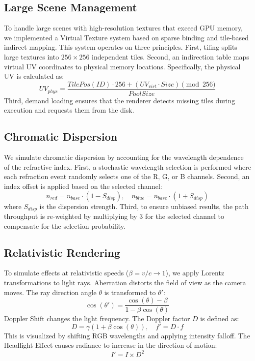 \documentclass[sigconf]{acmart}
\begin{document}
\subsection{Large Scene Management}
To handle large scenes with high-resolution textures that exceed GPU memory, we implemented a Virtual Texture system based on sparse binding and tile-based indirect mapping.
This system operates on three principles. First, tiling splits large textures into $256 \times 256$ independent tiles. Second, an indirection table maps virtual UV coordinates to physical memory locations. Specifically, the physical UV is calculated as:
\begin{equation}
UV_{phys} = \frac{TilePos(ID) \cdot 256 + (UV_{virt} \cdot Size) \pmod{256}}{PoolSize}
\end{equation}
Third, demand loading ensures that the renderer detects missing tiles during execution and requests them from the disk.

\subsection{Chromatic Dispersion}
We simulate chromatic dispersion by accounting for the wavelength dependence of the refractive index.
First, a stochastic wavelength selection is performed where each refraction event randomly selects one of the R, G, or B channels.
Second, an index offset is applied based on the selected channel:
\begin{equation}
n_{red} = n_{base} \cdot (1 - S_{disp}), \quad n_{blue} = n_{base} \cdot (1 + S_{disp})
\end{equation}
where $S_{disp}$ is the dispersion strength.
Third, to ensure unbiased results, the path throughput is re-weighted by multiplying by 3 for the selected channel to compensate for the selection probability.

\subsection{Relativistic Rendering}
To simulate effects at relativistic speeds ($\beta = v/c \to 1$), we apply Lorentz transformations to light rays.
Aberration distorts the field of view as the camera moves. The ray direction angle $\theta$ is transformed to $\theta'$:
\begin{equation}
\cos(\theta') = \frac{\cos(\theta) - \beta}{1 - \beta \cos(\theta)}
\end{equation}
Doppler Shift changes the light frequency. The Doppler factor $D$ is defined as:
\begin{equation}
D = \gamma(1 + \beta \cos(\theta)), \quad f' = D \cdot f
\end{equation}
This is visualized by shifting RGB wavelengths and applying intensity falloff.
The Headlight Effect causes radiance to increase in the direction of motion:
\begin{equation}
I' = I \times D^2
\end{equation}
\end{document}
